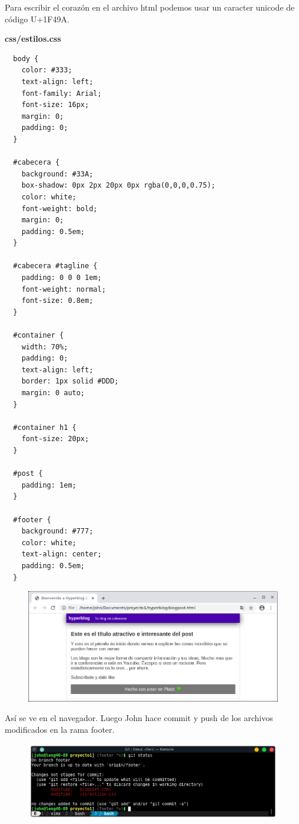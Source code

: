 \documentclass{article}
\begin{document}
Para escribir el corazón en el archivo html podemos usar un caracter unicode de
código U$+$1F49A.


\textbf{css/estilos.css}
\begin{verbatim}
  body {
    color: #333;
    text-align: left;
    font-family: Arial;
    font-size: 16px;
    margin: 0;
    padding: 0;
  }

  #cabecera {
    background: #33A;
    box-shadow: 0px 2px 20px 0px rgba(0,0,0,0.75);
    color: white;
    font-weight: bold;
    margin: 0;
    padding: 0.5em;
  }

  #cabecera #tagline {
    padding: 0 0 0 1em;
    font-weight: normal;
    font-size: 0.8em;
  }

  #container {
    width: 70%;
    padding: 0;
    text-align: left;
    border: 1px solid #DDD;
    margin: 0 auto;
  }

  #container h1 {
    font-size: 20px;
  }

  #post {
    padding: 1em;
  }

  #footer {
    background: #777;
    color: white;
    text-align: center;
    padding: 0.5em;
  }
\end{verbatim}

\begin{figure}[h!]
  \centering
  \includegraphics[scale=0.75]{./Pictures/282_footer_john.png}
\end{figure}

Así se ve en el navegador. Luego John hace commit y push de los archivos
modificados en la rama footer.

\begin{figure}[h!]
  \centering
  \includegraphics[scale=0.75]{./Pictures/283_status_john.png}
\end{figure}
\end{document}
